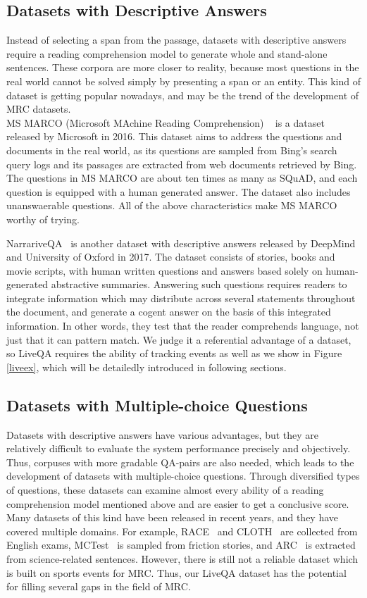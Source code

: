 \subsection{Datasets with Descriptive Answers}
Instead of selecting a span from the passage, datasets with descriptive answers require a reading comprehension model to generate whole and stand-alone sentences. These corpora are more closer to reality, because most questions in the real world cannot be solved simply by presenting a span or an entity. This kind of dataset is getting popular nowadays, and  may be the trend of the development of MRC datasets.\\ 
MS MARCO (Microsoft MAchine Reading Comprehension) ~\cite{Nguyen2016MS} is a dataset released by Microsoft in 2016. This dataset aims to address the questions and documents in the real world, as its questions are sampled from Bing's search query logs and its passages are extracted from web documents retrieved
by Bing. The questions in MS MARCO are about ten times as many as SQuAD, and each question is equipped with a human generated answer. The dataset also includes unanswaerable questions. All of the above characteristics make MS MARCO worthy of trying.

NarrariveQA~\cite{Ko2017The} is another dataset with descriptive answers released by DeepMind and University of Oxford in 2017. The dataset consists of stories, %
books and movie scripts, with human written questions and answers based solely on human-generated abstractive summaries. Answering such questions requires readers to integrate information which may distribute across several statements throughout the document, and generate a cogent answer on the basis of this integrated information. In other words, they test that the reader comprehends language, not just that it can pattern match. We judge it a referential advantage of a dataset, so LiveQA requires the ability of tracking events as well as we show in Figure \ref{liveex}, which will be detailedly introduced in following sections.

\subsection{Datasets with Multiple-choice Questions}
Datasets with descriptive answers have various advantages, but they are relatively diﬃcult to evaluate the system performance precisely and objectively. Thus, corpuses with more gradable QA-pairs are also needed, which leads to the development of datasets with multiple-choice questions. Through diversified types of questions, these datasets can examine almost every ability of a reading comprehension model mentioned above and are easier to get a conclusive score.
Many datasets of this kind have been released in recent years, and they have covered multiple domains. For example, RACE~\cite{lai2017race} and CLOTH~\cite{xie2017large} are collected from English exams, MCTest~\cite{richardson2013mctest} is sampled from friction stories, and ARC~\cite{clark2018think} is extracted from science-related sentences. However, there is still not a reliable dataset which is built on sports events for MRC. Thus, our LiveQA dataset has the potential for filling several gaps in the field of MRC. 

